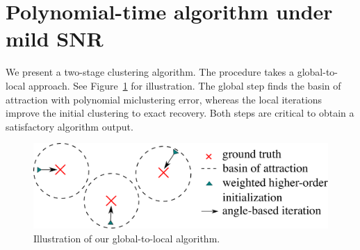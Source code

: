 \documentclass[lettersize,journal]{IEEEtran}
\theoremstyle{definition}
\theoremstyle{definition}
\begin{document}





\section{Polynomial-time algorithm under mild SNR}\label{sec:alg}
We present a two-stage clustering algorithm. The procedure takes a global-to-local approach. See Figure~\ref{fig:demo} for illustration. The global step finds the basin of attraction with polynomial miclustering error, whereas the local iterations improve the initial clustering to exact recovery. Both steps are critical to obtain a satisfactory algorithm output. 

\begin{figure}[t]
\centering
\includegraphics[width=\columnwidth]{alg_demo.pdf}
\caption{Illustration of our global-to-local algorithm.}\label{fig:demo}
\end{figure}
\end{document}
